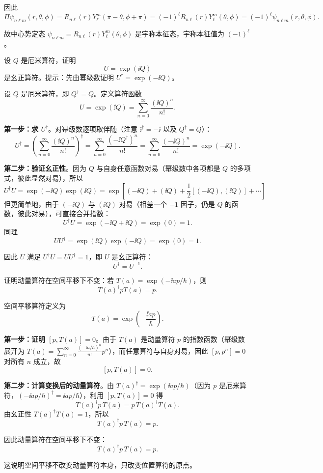 \begin{solution}
	因此
	\[
	\Pi\psi_{n\ell m}(r,\theta,\phi)=R_{n\ell}(r)Y_\ell^m(\pi-\theta,\phi+\pi)
	=(-1)^\ell R_{n\ell}(r)Y_\ell^m(\theta,\phi)=(-1)^\ell\psi_{n\ell m}(r,\theta,\phi).
	\]

	故中心势定态 $\psi_{n\ell m}=R_{n\ell}(r)Y_\ell^m(\theta,\phi)$ 是宇称本征态，宇称本征值为 $\boxed{(-1)^\ell}$。
	\end{solution}

\begin{question}
设 $Q$ 是厄米算符，证明
\[
U=\exp(\ii Q)
\]
是幺正算符。提示：先由幂级数证明 $U^\dagger=\exp(-\ii Q)$。
\end{question}
\begin{solution}
	设 $Q$ 是厄米算符，即 $Q^\dagger=Q$。定义算符函数
	\[
	U=\exp(\ii Q)=\sum_{n=0}^\infty\frac{(\ii Q)^n}{n!}.
	\]

	\textbf{第一步：求 $U^\dagger$}。对幂级数逐项取伴随（注意 $\ii^\dagger=-\ii$ 以及 $Q^\dagger=Q$）：
	\[
	U^\dagger=\left(\sum_{n=0}^\infty\frac{(\ii Q)^n}{n!}\right)^\dagger
	=\sum_{n=0}^\infty\frac{(-\ii Q^\dagger)^n}{n!}
	=\sum_{n=0}^\infty\frac{(-\ii Q)^n}{n!}
	=\exp(-\ii Q).
	\]

	\textbf{第二步：验证幺正性}。因为 $Q$ 与自身任意函数对易（幂级数中各项都是 $Q$ 的多项式，彼此显然对易），所以
	\[
	U^\dagger U=\exp(-\ii Q)\exp(\ii Q)
	=\exp[(-\ii Q)+(\ii Q)+\frac12[(-\ii Q),(\ii Q)]+\cdots]
	\]
	但更简单地，由于 $(-\ii Q)$ 与 $(\ii Q)$ 对易（相差一个 $-1$ 因子，仍是 $Q$ 的函数，彼此对易），可直接合并指数：
	\[
	U^\dagger U = \exp(-\ii Q + \ii Q) = \exp(0) = 1.
	\]
	同理
	\[
	UU^\dagger = \exp(\ii Q)\exp(-\ii Q) = \exp(0) = 1.
	\]

	因此 $U$ 满足 $U^\dagger U = UU^\dagger = 1$，即 $U$ 是幺正算符：
	\[
	\boxed{U^\dagger = U^{-1}}.
	\]
	\end{solution}

\begin{question}
证明动量算符在空间平移下不变：若 $T(a)=\exp(-\ii ap/\hbar)$，则
\[
T(a)^\dagger pT(a)=p.
\]
\end{question}
\begin{solution}
	空间平移算符定义为
	\[
	T(a)=\exp\!\left(-\frac{\ii a p}{\hbar}\right).
	\]

	\textbf{第一步：证明 $[p,T(a)]=0$}。由于 $T(a)$ 是动量算符 $p$ 的指数函数（幂级数展开为 $T(a)=\sum_{n=0}^\infty\frac{(-\ii a/\hbar)^n}{n!}p^n$），而任意算符与自身对易，因此 $[p,p^n]=0$ 对所有 $n$ 成立，故
	\[
	[p,T(a)]=0.
	\]

	\textbf{第二步：计算变换后的动量算符}。由 $T(a)^\dagger=\exp(\ii a p/\hbar)$（因为 $p$ 是厄米算符，$(-\ii a p/\hbar)^\dagger=\ii a p/\hbar$），利用 $[p,T(a)]=0$ 得
	\[
	T(a)^\dagger p\,T(a) = p\,T(a)^\dagger T(a).
	\]
	由幺正性 $T(a)^\dagger T(a)=1$，所以
	\[
	T(a)^\dagger p\,T(a) = p.
	\]

	因此动量算符在空间平移下不变：
	\[
	\boxed{T(a)^\dagger p\,T(a)=p}.
	\]

	这说明空间平移不改变动量算符本身，只改变位置算符的原点。
	\end{solution}

